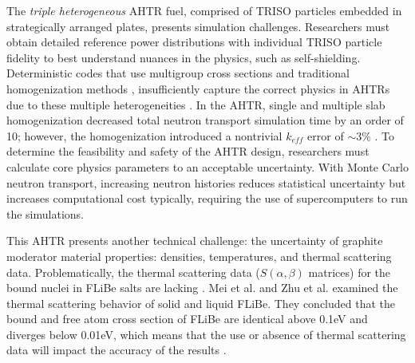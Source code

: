 The \emph{triple heterogeneous} \gls{AHTR} fuel, comprised of \gls{TRISO} 
particles embedded in strategically arranged plates, presents simulation 
challenges. 
Researchers must obtain detailed reference power distributions with individual 
\gls{TRISO} particle fidelity to best understand nuances in the physics, such 
as self-shielding.
Deterministic codes that use multigroup cross sections and traditional 
homogenization methods \cite{ramey_monte_2018}, insufficiently capture the 
correct physics in \glspl{AHTR} due to these multiple heterogeneities
\cite{ramey_monte_2018}. 
In the \gls{AHTR}, single and multiple slab homogenization decreased total 
neutron transport simulation time by an order of 10; however, the homogenization 
introduced a nontrivial $k_{eff}$ error of $\sim$3\% 
\cite{ramey_monte_2018,cisneros_neutronics_2012}.
To determine the feasibility and safety of the \gls{AHTR} design, researchers 
must calculate core physics parameters to an acceptable uncertainty. 
With Monte Carlo neutron transport, increasing neutron histories reduces statistical 
uncertainty but increases computational cost typically, requiring the use of 
supercomputers to run the simulations.

This \gls{AHTR} presents another technical challenge: the uncertainty of 
graphite moderator material properties: densities, temperatures, and thermal 
scattering data.
Problematically, the thermal scattering data ($S(\alpha,\beta)$ matrices) for 
the bound nuclei in \gls{FLiBe} salts are lacking \cite{ramey_monte_2018}. 
Mei et al. \cite{mei_investigation_2013} and Zhu et al. \cite{zhu_thermal_2017} 
examined the thermal scattering behavior of solid and liquid \gls{FLiBe}.
They concluded that the bound and free atom cross section of \gls{FLiBe} are 
identical above 0.1eV and diverges below 0.01eV, which means that the use or 
absence of thermal scattering data will impact the accuracy of the results 
\cite{ramey_monte_2018}. 

